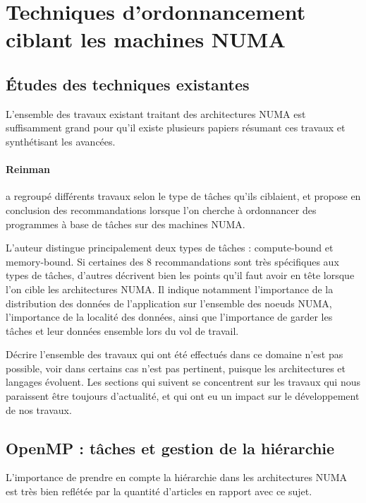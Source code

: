 \section{Techniques d'ordonnancement ciblant les machines NUMA}\label{sec:rw:numa}

\subsection{Études des techniques existantes}

L'ensemble des travaux existant traitant des architectures NUMA est suffisamment grand pour qu'il existe plusieurs papiers résumant ces travaux et synthétisant les avancées.

\paragraph{Reinman~\cite{Reinman2015}} a regroupé différents travaux selon le type de tâches qu'ils ciblaient, et propose en conclusion des recommandations lorsque l'on cherche à ordonnancer des programmes à base de tâches sur des machines NUMA.

L'auteur distingue principalement deux types de tâches : compute-bound et memory-bound.
Si certaines des 8 recommandations sont très spécifiques aux types de tâches, d'autres décrivent bien les points qu'il faut avoir en tête lorsque l'on cible les architectures NUMA.
Il indique notamment l'importance de la distribution des données de l'application sur l'ensemble des noeuds NUMA, l'importance de la localité des données, ainsi que l'importance de garder les tâches et leur données ensemble lors du vol de travail.



Décrire l'ensemble des travaux qui ont été effectués dans ce domaine n'est pas possible, voir dans certains cas n'est pas pertinent, puisque les architectures et langages évoluent.
Les sections qui suivent se concentrent sur les travaux qui nous paraissent être toujours d'actualité, et qui ont eu un impact sur le développement de nos travaux.

\subsection{OpenMP : tâches et gestion de la hiérarchie}

L'importance de prendre en compte la hiérarchie dans les architectures NUMA est très bien reflétée par la quantité d'articles en rapport avec ce sujet.

